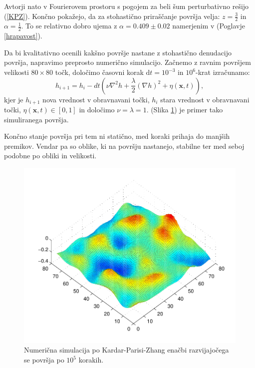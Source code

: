 \documentclass[a4paper, twoside, 12pt]{book}
\begin{document}
    Avtorji \cite{kardar1986dynamic} nato v Fourierovem prostoru s pogojem za beli šum perturbativno rešijo (\ref{KPZ}). Končno pokažejo, da za stohastično priraščanje površja velja: $z = \frac{3}{2}$ in $\alpha=\frac{1}{2}$. To se relativno dobro ujema z $\alpha =  0.409 \pm 0.02$ namerjenim v (Poglavje \ref{hrapavost}).

Da bi kvalitativno ocenili kakšno površje nastane z stohastično denudacijo površja, napravimo preprosto numerično simulacijo. Začnemo z ravnim površjem velikosti $80\times80$ točk, določimo časovni korak $\mathrm{d}t=10^{-3}$ in $10^6$-krat izračunamo:
\begin{equation} 
  h_{i+1} = h_i - dt (\nu \nabla^2 h + \frac{\lambda}{2} (\nabla h)^2 + \eta (\mathbf{x},t)),
\end{equation}
kjer je $h_{i+1}$ nova vrednost v obravnavani točki, $h_{i}$ stara vrednost v obravnavani točki, $\eta (\mathbf{x},t) \in [0,1]$ in določimo $\nu = \lambda = 1$. (Slika \ref{fig:KPZ-numericno}) je primer tako simuliranega površja.

Končno stanje površja pri tem ni statično, med koraki prihaja do manjših premikov. Vendar pa so oblike, ki na površju nastanejo, stabilne ter med seboj podobne po obliki in velikosti.

    \begin{figure}[h]
      \begin{center}
        \includegraphics[width=12cm]{slike/KPZ-numericno}
      \end{center}
      \caption{Numerična simulacija po Kardar-Parisi-Zhang enačbi razvijajočega se površja po $10^5$ korakih.}
      \label{fig:KPZ-numericno}
    \end{figure}
\end{document}
